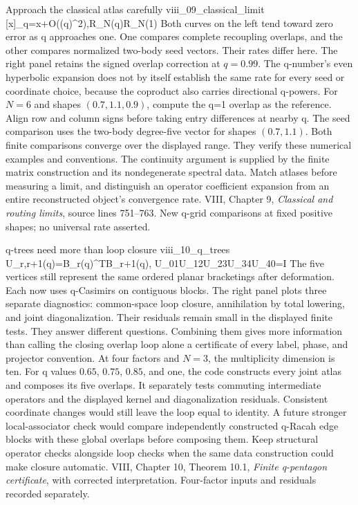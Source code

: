 {Approach the classical atlas carefully}
{viii_09_classical_limit}
{[x]_q=x+O((\log q)^2),\qquad \mathcal R_N(q)\longrightarrow\mathcal R_N(1)
\quad{}}
{Both curves on the left tend toward zero error as q approaches one. One compares complete recoupling overlaps, and the other compares normalized two-body seed vectors. Their rates differ here. The right panel retains the signed overlap correction at $q=0.99$. The q-number's even hyperbolic expansion does not by itself establish the same rate for every seed or coordinate choice, because the coproduct also carries directional q-powers.}
{For $N=6$ and shapes $(0.7,1.1,0.9)$, compute the q=1 overlap as the reference. Align row and column signs before taking entry differences at nearby q. The seed comparison uses the two-body degree-five vector for shapes $(0.7,1.1)$. Both finite comparisons converge over the displayed range. They verify these numerical examples and conventions. The continuity argument is supplied by the finite matrix construction and its nondegenerate spectral data.}
{Match atlases before measuring a limit, and distinguish an operator coefficient expansion from an entire reconstructed object's convergence rate.}
{VIII, Chapter 9, \emph{Classical and routing limits}, source lines 751--763. New q-grid comparisons at fixed positive shapes; no universal rate asserted.}

{q-trees need more than loop closure}
{viii_10_q_trees}
{U_{r,r+1}(q)=B_r(q)^{\mathsf T}B_{r+1}(q),\qquad
U_{01}U_{12}U_{23}U_{34}U_{40}=I\quad{}}
{The five vertices still represent the same ordered planar bracketings after deformation. Each now uses q-Casimirs on contiguous blocks. The right panel plots three separate diagnostics: common-space loop closure, annihilation by total lowering, and joint diagonalization. Their residuals remain small in the displayed finite tests. They answer different questions. Combining them gives more information than calling the closing overlap loop alone a certificate of every label, phase, and projector convention.}
{At four factors and $N=3$, the multiplicity dimension is ten. For q values $0.65$, $0.75$, $0.85$, and one, the code constructs every joint atlas and composes its five overlaps. It separately tests commuting intermediate operators and the displayed kernel and diagonalization residuals. Consistent coordinate changes would still leave the loop equal to identity. A future stronger local-associator check would compare independently constructed q-Racah edge blocks with these global overlaps before composing them.}
{Keep structural operator checks alongside loop checks when the same data construction could make closure automatic.}
{VIII, Chapter 10, Theorem 10.1, \emph{Finite q-pentagon certificate}, with corrected interpretation. Four-factor inputs and residuals recorded separately.}

